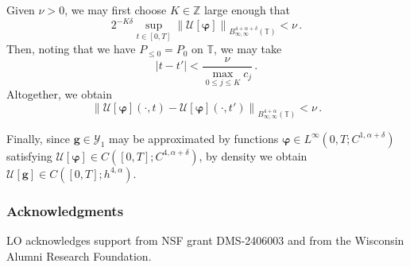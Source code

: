 \documentclass[11pt,reqno]{amsart}
\newcommand{\Z}{\mathbb{Z}}
\newcommand{\T}{\mathbb{T}}
\newcommand{\abs}[1]{\left\lvert #1 \right\rvert}
\newcommand{\norm}[1]{\left\lVert #1 \right\rVert}
\newcommand{\mc}[1]{\mathcal{#1}}
\theoremstyle{definition}
\begin{document}
Given $\nu>0$, we may first choose $K\in\Z$ large enough that
\begin{equation}
  2^{-K\delta}\sup_{t\in[0,T]}\norm{\mc{U}[\bm{\varphi}]}_{B^{4+\alpha+\delta}_{\infty,\infty}(\T)}< \nu\,.
\end{equation}
%
Then, noting that we have $P_{\le 0}=P_0$ on $\T$, we may take 
\begin{equation}
  \abs{t-t'} < \frac{\nu}{\max_{0\le j\le K}c_j}\,.
\end{equation}
%
%
Altogether, we obtain
\begin{equation}
  \norm{\mc{U}[\bm{\varphi}](\cdot,t)-\mc{U}[\bm{\varphi}](\cdot,t')}_{B^{4+\alpha}_{\infty,\infty}(\T)}<\nu\,.
\end{equation}


Finally, since $\bm{g}\in \mc{Y}_1$ may be approximated by functions $\bm{\varphi}\in L^\infty(0,T;C^{1,\alpha+\delta})$ satisfying $\mc{U}[\bm{\varphi}]\in C([0,T];C^{4,\alpha+\delta})$, by density we obtain $\mc{U}[\bm{g}]\in C([0,T];h^{4,\alpha})$.








\subsubsection*{Acknowledgments} LO acknowledges support from NSF grant DMS-2406003 and from the Wisconsin Alumni Research Foundation.



 



\end{document}

